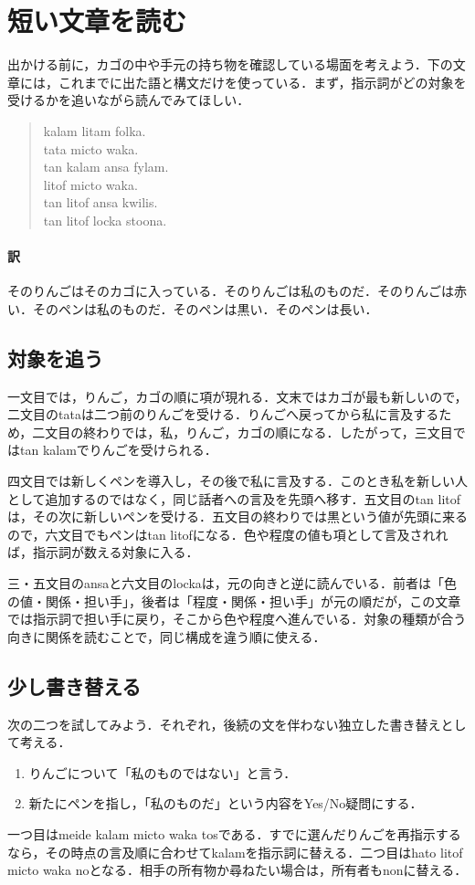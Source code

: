 \documentclass[b5paper, 10pt]{ltjsarticle}
\newcommand{\ko}[1]{\textsf{#1}}
\begin{document}
\section{短い文章を読む}
出かける前に，カゴの中や手元の持ち物を確認している場面を考えよう．下の文章には，これまでに出た語と構文だけを使っている．まず，指示詞がどの対象を受けるかを追いながら読んでみてほしい．

\begin{quote}
\ko{kalam litam folka.}\\
\ko{tata micto waka.}\\
\ko{tan kalam ansa fylam.}\\
\ko{litof micto waka.}\\
\ko{tan litof ansa kwilis.}\\
\ko{tan litof locka stoona.}
\end{quote}

\paragraph{訳} そのりんごはそのカゴに入っている．そのりんごは私のものだ．そのりんごは赤い．そのペンは私のものだ．そのペンは黒い．そのペンは長い．

\subsection{対象を追う}
一文目では，りんご，カゴの順に項が現れる．文末ではカゴが最も新しいので，二文目の\ko{tata}は二つ前のりんごを受ける．りんごへ戻ってから私に言及するため，二文目の終わりでは，私，りんご，カゴの順になる．したがって，三文目では\ko{tan kalam}でりんごを受けられる．

四文目では新しくペンを導入し，その後で私に言及する．このとき私を新しい人として追加するのではなく，同じ話者への言及を先頭へ移す．五文目の\ko{tan litof}は，その次に新しいペンを受ける．五文目の終わりでは黒という値が先頭に来るので，六文目でもペンは\ko{tan litof}になる．色や程度の値も項として言及されれば，指示詞が数える対象に入る．

三・五文目の\ko{ansa}と六文目の\ko{locka}は，元の向きと逆に読んでいる．前者は「色の値・関係・担い手」，後者は「程度・関係・担い手」が元の順だが，この文章では指示詞で担い手に戻り，そこから色や程度へ進んでいる．対象の種類が合う向きに関係を読むことで，同じ構成を違う順に使える．

\subsection{少し書き替える}
次の二つを試してみよう．それぞれ，後続の文を伴わない独立した書き替えとして考える．
\begin{enumerate}
    \item りんごについて「私のものではない」と言う．
    \item 新たにペンを指し，「私のものだ」という内容をYes/No疑問にする．
\end{enumerate}
一つ目は\ko{meide kalam micto waka tos}である．すでに選んだりんごを再指示するなら，その時点の言及順に合わせて\ko{kalam}を指示詞に替える．二つ目は\ko{hato litof micto waka no}となる．相手の所有物か尋ねたい場合は，所有者も\ko{non}に替える．
\end{document}
